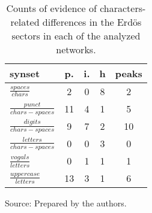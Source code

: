 \begin{table}[h!]
\begin{center}
\caption{Counts of evidence of characters-related differences in the Erd\"os sectors in each of the analyzed networks.}
	\def\arraystretch{1.5}
\begin{tabular}{| l || c | c | c || c |}\hline
{\bf synset} & {\bf p.} & {\bf i.} & {\bf h} & {\bf peaks} \\\hline\hline
$\frac{spaces}{chars}$ & 2  & 0  & 8  & 2 \\
$\frac{punct}{chars-spaces}$ & 11  & 4  & 1  & 5 \\
$\frac{digits}{chars-spaces}$ & 9  & 7  & 2  & 10 \\\hline
$\frac{letters}{chars-spaces}$ & 0  & 0  & 3  & 0 \\
$\frac{vogals}{letters}$ & 0  & 1  & 1  & 1 \\
$\frac{uppercase}{letters}$ & 13  & 3  & 1  & 6 \\\hline
\end{tabular}
\begin{flushleft}
		Source: Prepared by the authors.\
\end{flushleft}
\end{center}
\end{table}
